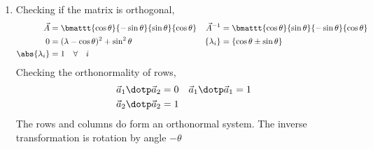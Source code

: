 \begin{enumerate}
\begin{enumerate}
              \item Checking if the matrix is orthogonal,
                    \begin{align}
                        \vec{A}                    & = \bmattt{\cos \theta}
                        {-\sin \theta}
                        {\sin \theta}{\cos \theta} &
                        \vec{A}^{-1}               & = \bmattt{\cos \theta}
                        {\sin \theta}
                        {-\sin \theta}{\cos \theta}                                    \\
                        0                          & = (\lambda - \cos \theta)^2
                        + \sin^2 \theta            &
                        \{\lambda_i\}              & = \{\cos \theta \pm \sin \theta\} \\
                        \abs{\lambda_i}            & = 1 \quad \forall \quad i
                    \end{align}
                    Checking the orthonormality of rows,
                    \begin{align}
                        \vec{a}_1 \dotp \vec{a}_2 & = 0 &
                        \vec{a}_1 \dotp \vec{a}_1 & = 1   \\
                        \vec{a}_2 \dotp \vec{a}_2 & = 1
                    \end{align}
                    The rows and columns do form an orthonormal system. The inverse
                    transformation is rotation by angle $ -\theta $


\end{enumerate}
\end{enumerate}
